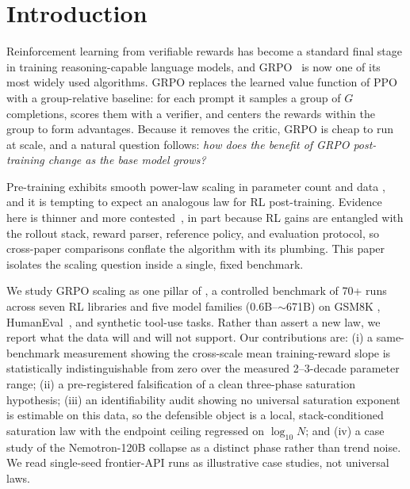 \section{Introduction}
\label{sec:p1-intro}
Reinforcement learning from verifiable rewards has become a standard final stage
in training reasoning-capable language models, and GRPO~\citep{shao2024deepseekmath, guo2025deepseekr1} is now one of its most widely used algorithms. GRPO replaces
the learned value function of PPO~\citep{schulman2017proximal} with a
group-relative baseline: for each prompt it samples a group of $G$ completions,
scores them with a verifier, and centers the rewards within the group to form
advantages. Because it removes the critic, GRPO is cheap to run at scale, and a
natural question follows: \emph{how does the benefit of GRPO post-training change
as the base model grows?}

Pre-training exhibits smooth power-law scaling in parameter count and data
\citep{kaplan2020scalinglaws, hoffmann2022chinchilla}, and it is tempting to expect
an analogous law for RL post-training. Evidence here is thinner and more
contested~\citep{hilton2023rlscaling, rafailov2024rlhfscaling, nimmaturi2025predictive},
in part because RL gains are entangled with the rollout stack, reward parser,
reference policy, and evaluation protocol, so cross-paper comparisons conflate the
algorithm with its plumbing. This paper isolates the scaling question inside a
single, fixed benchmark.

We study GRPO scaling as one pillar of \ours{}, a controlled benchmark of 70+ runs
across seven RL libraries and five model families ($0.6$B--$\sim$671B) on GSM8K
\citep{cobbe2021training}, HumanEval~\citep{chen2021codex}, and synthetic tool-use
tasks. Rather than assert a new law, we report what the data will and will not
support. Our contributions are: (i) a same-benchmark measurement showing the
cross-scale mean training-reward slope is statistically indistinguishable from zero
over the measured 2--3-decade parameter range; (ii) a pre-registered falsification of a clean
three-phase saturation hypothesis; (iii) an identifiability audit showing no
universal saturation exponent is estimable on this data, so the defensible object
is a local, stack-conditioned saturation law with the endpoint ceiling regressed
on $\log_{10} N$; and (iv) a case study of the Nemotron-120B collapse as a
distinct phase rather than trend noise. We read single-seed frontier-API runs as
illustrative case studies, not universal laws.

